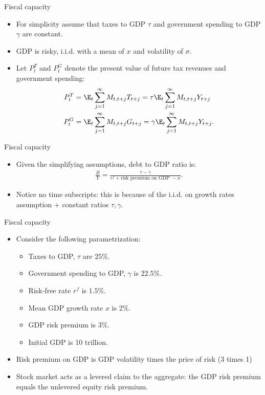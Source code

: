 \documentclass[11pt,xcolor={dvipsnames},aspectratio=159,hyperref={pdftex,pdfpagemode=UseNone,hidelinks,pdfdisplaydoctitle=true},usepdftitle=false]{beamer}
\begin{document}
\begin{frame}{Fiscal capacity}  
    \begin{itemize}
        \item For simplicity assume that taxes to GDP $\tau$ and government spending to GDP $\gamma$ are constant.
        \item GDP  is risky, i.i.d. with a mean of $x$ and volatility of $\sigma$.
        \item Let $P^T_t$ and $P^G_t$ denote the present value of future tax revenues and government spending:
        \begin{align*}
            P^T_t & = \E_t \sum_{j=1}^\infty M_{t,t+j} T_{t+j} = \tau \E_t \sum_{j=1}^\infty M_{t,t+j} Y_{t+j}\\
            P^G_t & = \E_t \sum_{j=1}^\infty M_{t,t+j} G_{t+j} = \gamma \E_t \sum_{j=1}^\infty M_{t,t+j} Y_{t+j}.
        \end{align*}
     \end{itemize}
\end{frame}

\begin{frame}{Fiscal capacity}  
    \begin{itemize}
        \item Given the simplifying assumptions, debt to GDP ratio is: \begin{align*}
            \frac{B}{Y} = \frac{\tau-\gamma}{r^f + \text{risk premium on GDP } - x}.
        \end{align*}
        \item Notice no time subscripts: this is because of the i.i.d. on growth rates assumption + constant ratios $\tau,\gamma$.
     \end{itemize}
\end{frame}


\begin{frame}{Fiscal capacity}  
    \begin{itemize}
        \item Consider the following parametrization: \begin{itemize}
        \item Taxes to GDP, $\tau$ are $25\%$.
        \item Government spending to GDP, $\gamma$ is $22.5\%$.
        \item Risk-free rate $r^f$ is $1.5\%$.
        \item Mean GDP growth rate $x$ is $2\%$.
        \item GDP risk premium is $3\%$.
        \item Initial GDP is 10 trillion.
        \end{itemize}
        \item Risk premium on GDP is GDP volatility times the price of risk (3 times 1)
        \item Stock market acts as a levered claim to the aggregate: the GDP risk premium equals the unlevered equity risk premium. 
        
     \end{itemize}
\end{frame}
\end{document}
